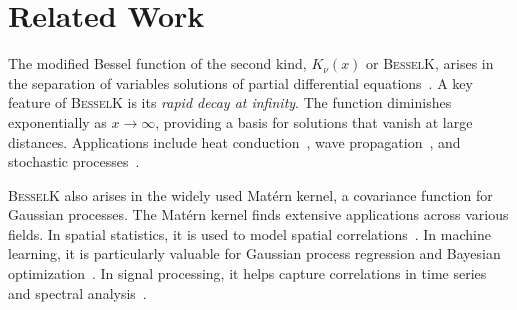 \section{Related Work}


The modified Bessel function of the second kind, \( K_\nu(x) \) or \textsc{BesselK}, arises in the separation of variables solutions of partial differential equations~\cite{weisstein2002modified,dunster1990bessel, zhukovsky2017solving}. A key feature of \textsc{BesselK} is its \textit{rapid decay at infinity}. The function diminishes exponentially as \( x \to \infty \), providing a basis for solutions that vanish at large distances. Applications include heat conduction~\cite{hetnarski2009heat}, wave propagation~\cite{gomez2017physics}, and stochastic processes~\cite{pogany2013bessel}.


\textsc{BesselK} also arises in the widely used Mat\'{e}rn kernel, a covariance function for Gaussian processes. The Mat\'{e}rn kernel finds extensive applications across various fields. In spatial statistics, it is used to model spatial correlations~\cite{wang2023parameterization}. In machine learning, it is particularly valuable for Gaussian process regression and Bayesian optimization~\cite{albahar2021robust}. In signal processing, it helps capture correlations in time series and spectral analysis~\cite{yin2020linear}. 
 
